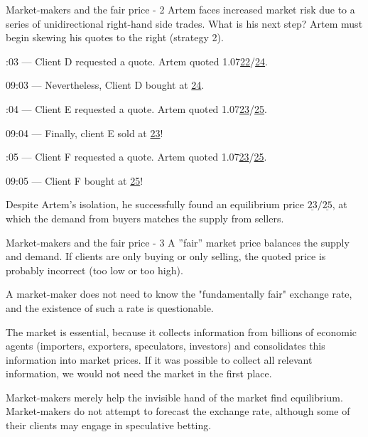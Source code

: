 \documentclass{beamer}
\begin{document}
\begin{frame}{Market-makers and the fair price - 2}
\justify
Artem faces increased market risk due to a series of unidirectional right-hand side trades. What is his next step? Artem must begin skewing his quotes to the right (strategy 2).

:03 --- Client D requested a quote. Artem quoted 1.07\underline{22}/\underline{24}.

09:03 --- Nevertheless, Client D bought at \underline{24}.

:04 --- Client E requested a quote. Artem quoted 1.07\underline{23}/\underline{25}.

09:04 --- Finally, client E sold at \underline{23}!

:05 --- Client F requested a quote. Artem quoted 1.07\underline{23}/\underline{25}.

09:05 --- Client F bought at  \underline{25}!

\justify
Despite Artem's isolation, he successfully found an equilibrium price $\underline{23}/\underline{25}$, at which the demand from buyers matches the supply from sellers.
\end{frame}



\begin{frame}{Market-makers and the fair price - 3}
\justify
A ''fair'' market price balances the supply and demand. If clients are only buying or only selling, the quoted price
is probably incorrect (too low or too high).

\justify
A market-maker does not need to know the "fundamentally fair" exchange rate, and the existence of such a rate is questionable.

\justify
The market is essential, because it collects information from billions of economic agents (importers, exporters, speculators, investors) and consolidates this information into market prices. If it was possible to collect all relevant information, we would not need the market in the first place.

\justify
Market-makers merely help the invisible hand of the market find equilibrium. Market-makers do not attempt to forecast the exchange rate, although some of their clients may engage in speculative betting.
\end{frame}
\end{document}
